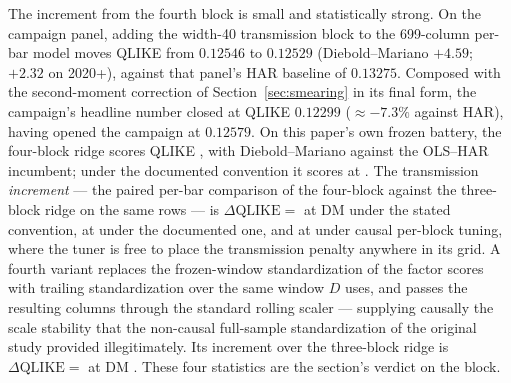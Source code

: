 The increment from the fourth block is small and statistically strong. On the
campaign panel, adding the width-40 transmission block to the 699-column
per-bar model moves QLIKE from $0.12546$ to $0.12529$ (Diebold--Mariano
$+4.59$; $+2.32$ on 2020+), against that panel's HAR baseline of $0.13275$.
Composed with the second-moment correction of Section~\ref{sec:smearing} in
its final form, the campaign's headline number closed at QLIKE $0.12299$
($\approx -7.3\%$ against HAR), having opened the campaign at $0.12579$.
On this paper's own frozen battery, the four-block ridge scores QLIKE
\unifBlkFourUserQLIKE{}, with Diebold--Mariano \unifBlkFourUserDM{} against
the OLS--HAR incumbent; under the documented convention it scores
\unifBlkFourDocQLIKE{} at \unifBlkFourDocDM{}. The transmission
\emph{increment} --- the paired per-bar comparison of the four-block
against the three-block ridge on the same rows --- is
$\Delta\mathrm{QLIKE} = $ \unifIncrBlkFourUserDQ{} at DM
\unifIncrBlkFourUserDM{} under the stated convention,
\unifIncrBlkFourDocDQ{} at \unifIncrBlkFourDocDM{} under the documented
one, and \unifIncrBlkFourTunedDQ{} at \unifIncrBlkFourTunedDM{} under
causal per-block tuning, where the tuner is free to place the transmission
penalty anywhere in its grid. A fourth variant replaces the frozen-window
standardization of the factor scores with trailing standardization over
the same window $D$ uses, and passes the resulting columns through the
standard rolling scaler --- supplying causally the scale stability that
the non-causal full-sample standardization of the original study provided
illegitimately. Its increment over the three-block ridge is
$\Delta\mathrm{QLIKE} = $ \unifIncrBlkFourTrailDQ{} at DM
\unifIncrBlkFourTrailDM{}. These four statistics are the section's
verdict on the block.


